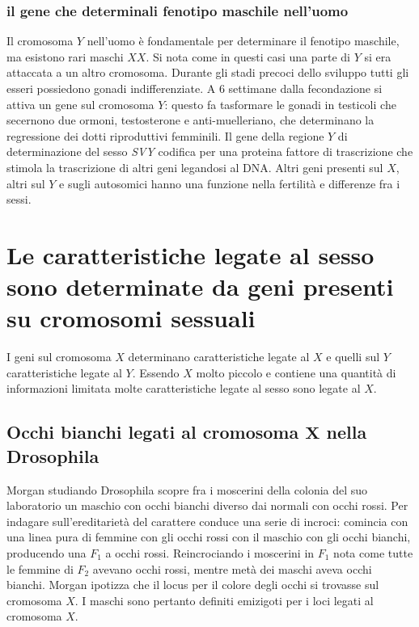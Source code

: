 		\subsubsection{il gene che determinali fenotipo maschile nell'uomo}
		Il cromosoma $Y$ nell'uomo \`e fondamentale per determinare il fenotipo maschile, ma esistono rari maschi $XX$.
		Si nota come in questi casi una parte di $Y$ si era attaccata a un altro cromosoma. 
		Durante gli stadi precoci dello sviluppo tutti gli esseri possiedono gonadi indifferenziate.
		A $6$ settimane dalla fecondazione si attiva un gene sul cromosoma $Y$: questo fa tasformare le gonadi in testicoli che secernono due ormoni, testosterone e anti-muelleriano, che determinano la regressione dei dotti riproduttivi femminili.
		Il gene della regione $Y$ di determinazione del sesso \emph{SVY} codifica per una proteina fattore di trascrizione che stimola la trascrizione di altri geni legandosi al DNA.
		Altri geni presenti sul $X$, altri sul $Y$ e sugli autosomici hanno una funzione nella fertilit\`a e differenze fra i sessi.

\section{Le caratteristiche legate al sesso sono determinate da geni presenti su cromosomi sessuali}
I geni sul cromosoma $X$ determinano caratteristiche legate al $X$ e quelli sul $Y$ caratteristiche legate al $Y$.
Essendo $X$ molto piccolo e contiene una quantit\`a di informazioni limitata molte caratteristiche legate al sesso sono legate al $X$.

	\subsection{Occhi bianchi legati al cromosoma $\mathbf{X}$ nella Drosophila}
	Morgan studiando Drosophila scopre fra i moscerini della colonia del suo laboratorio un maschio con occhi bianchi diverso dai normali con occhi rossi.
	Per indagare sull'ereditariet\`a del carattere conduce una serie di incroci: comincia con una linea pura di femmine con gli occhi rossi con il maschio con gli occhi bianchi, producendo una $F_1$
	a occhi rossi.
	Reincrociando i moscerini in $F_1$ nota come tutte le femmine di $F_2$ avevano occhi rossi, mentre met\`a dei maschi aveva occhi bianchi.
	Morgan ipotizza che il locus per il colore degli occhi si trovasse sul cromosoma $X$.
	I maschi sono pertanto definiti emizigoti per i loci legati al cromosoma $X$.

